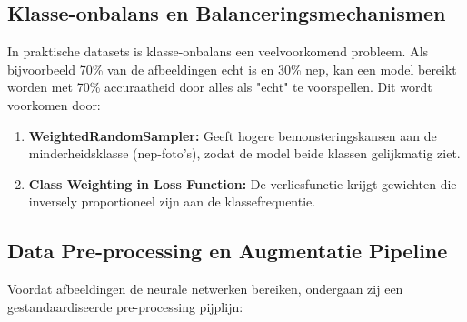 \subsection{Klasse-onbalans en Balanceringsmechanismen}

In praktische datasets is klasse-onbalans een veelvoorkomend probleem. Als bijvoorbeeld 70\% van de afbeeldingen echt is en 30\% nep, kan een model bereikt worden met 70\% accuraatheid door alles als "echt" te voorspellen. Dit wordt voorkomen door:

\begin{enumerate}
    \item \textbf{WeightedRandomSampler:} Geeft hogere bemonsteringskansen aan de minderheidsklasse (nep-foto's), zodat de model beide klassen gelijkmatig ziet.
    \item \textbf{Class Weighting in Loss Function:} De verliesfunctie krijgt gewichten die inversely proportioneel zijn aan de klassefrequentie.
\end{enumerate}


\subsection{Data Pre-processing en Augmentatie Pipeline}

Voordat afbeeldingen de neurale netwerken bereiken, ondergaan zij een gestandaardiseerde pre-processing pijplijn:

